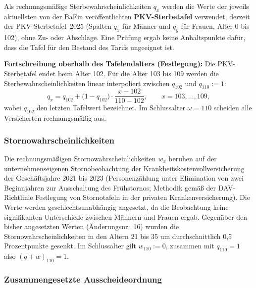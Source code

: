 Als rechnungsmäßige Sterbewahrscheinlichkeiten $q_x$ werden die Werte
der jeweils aktuellsten von der BaFin veröffentlichten
\textbf{PKV-Sterbetafel} verwendet, derzeit der PKV-Sterbetafel~2025
(Spalten $q_x$ für Männer und $q_y$ für Frauen, Alter 0 bis 102), ohne
Zu- oder Abschläge. Eine Prüfung ergab keine Anhaltspunkte dafür, dass
die Tafel für den Bestand des Tarifs ungeeignet ist.

\textbf{Fortschreibung oberhalb des Tafelendalters (Festlegung):} Die
PKV-Sterbetafel endet beim Alter 102. Für die Alter 103 bis 109 werden
die Sterbewahrscheinlichkeiten linear interpoliert zwischen $q_{102}$
und $q_{110} := 1$:
\begin{equation}
q_x = q_{102} + \bigl(1 - q_{102}\bigr)\cdot\frac{x-102}{110-102},
\qquad x = 103,\dots,109,
\label{eq:qfort}
\end{equation}
wobei $q_{102}$ den letzten Tafelwert bezeichnet. Im Schlussalter
$\omega = 110$ scheiden alle Versicherten rechnungsmäßig aus.

\subsubsection{Stornowahrscheinlichkeiten}\label{sec:storno}

Die rechnungsmäßigen Stornowahrscheinlichkeiten $w_x$ beruhen auf der
unternehmenseigenen Stornobeobachtung der Krankheitskostenvollversicherung
der Geschäftsjahre 2021 bis 2023 (Personenzählung unter Elimination von
zwei Beginnjahren zur Ausschaltung des Frühstornos; Methodik gemäß der
DAV-Richtlinie \glqq Festlegung von Stornotafeln in der privaten
Krankenversicherung\grqq). Die Werte werden geschlechtsunabhängig
angesetzt, da die Beobachtung keine signifikanten Unterschiede zwischen
Männern und Frauen ergab. Gegenüber den bisher angesetzten Werten
(Änderungsnr.~16) wurden die Stornowahrscheinlichkeiten in den Altern
21 bis 35 um durchschnittlich 0{,}5 Prozentpunkte gesenkt. Im
Schlussalter gilt $w_{110} := 0$, zusammen mit $q_{110} = 1$ also
$(q+w)_{110} = 1$.

\subsubsection{Zusammengesetzte Ausscheideordnung}\label{sec:zao}

